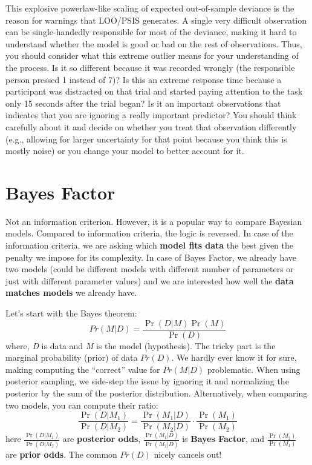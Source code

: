 \documentclass[
]{book}
\begin{document}
This explosive powerlaw-like scaling of expected out-of-sample deviance is the reason for warnings that LOO/PSIS generates. A single very difficult observation can be single-handedly responsible for most of the deviance, making it hard to understand whether the model is good or bad on the rest of observations. Thus, you should consider what this extreme outlier means for your understanding of the process. Is it so different because it was recorded wrongly (the responsible person pressed 1 instead of 7)? Is this an extreme response time because a participant was distracted on that trial and started paying attention to the task only 15 seconds after the trial began? Is it an important observations that indicates that you are ignoring a really important predictor? You should think carefully about it and decide on whether you treat that observation differently (e.g., allowing for larger uncertainty for that point because you think this is mostly noise) or you change your model to better account for it.

\hypertarget{bayes-factor}{%
\section{Bayes Factor}\label{bayes-factor}}

Not an information criterion. However, it is a popular way to compare Bayesian models. Compared to information criteria, the logic is reversed. In case of the information criteria, we are asking which \textbf{model fits data} the best given the penalty we impose for its complexity. In case of Bayes Factor, we already have two models (could be different models with different number of parameters or just with different parameter values) and we are interested how well the \textbf{data matches models} we already have.

Let's start with the Bayes theorem:
\[Pr(M|D)=\frac {\Pr(D|M)\Pr(M)}{\Pr(D)}\]
where, \emph{D} is data and \emph{M} is the model (hypothesis). The tricky part is the marginal probability (prior) of data \(Pr(D)\). We hardly ever know it for sure, making computing the ``correct'' value for \(Pr(M|D)\) problematic. When using posterior sampling, we side-step the issue by ignoring it and normalizing the posterior by the sum of the posterior distribution. Alternatively, when comparing two models, you can compute their ratio:
\[{\frac {\Pr(D|M_{1})}{\Pr(D|M_{2})}}={\frac {\Pr(M_{1}|D)}{\Pr(M_{2}|D)}} \cdot {\frac {\Pr(M_{1})}{\Pr(M_{2})}}\]
here \(\frac{\Pr(D|M_{1})}{\Pr(D|M_{2})}\) are \textbf{posterior odds}, \(\frac {\Pr(M_{1}|D)}{\Pr(M_{2}|D)}\) is \textbf{Bayes Factor}, and \(\frac {\Pr(M_{2})}{\Pr(M_{1})}\) are \textbf{prior odds}. The common \(Pr(D)\) nicely cancels out!
\end{document}
